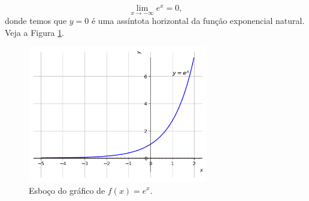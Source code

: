\cleardoublepage\documentclass[../main.tex]{subfiles}
\begin{document}
\begin{ex}\label{ex:lim_exp_x-inf}
  \begin{equation*}
    \lim_{x\to -\infty} e^x = 0,
  \end{equation*}
  donde temos que $y=0$ é uma assíntota horizontal da função exponencial natural. Veja a Figura \ref{fig:lim_ex_xinf_exp}.

  \begin{figure}[H]
    \centering
    \includegraphics[width=0.7\textwidth]{fig_lim/fig_ex_xinf_exp}
    \caption{Esboço do gráfico de $f(x)=e^x$.}
    \label{fig:lim_ex_xinf_exp}
  \end{figure}
\end{ex}
\end{document}
